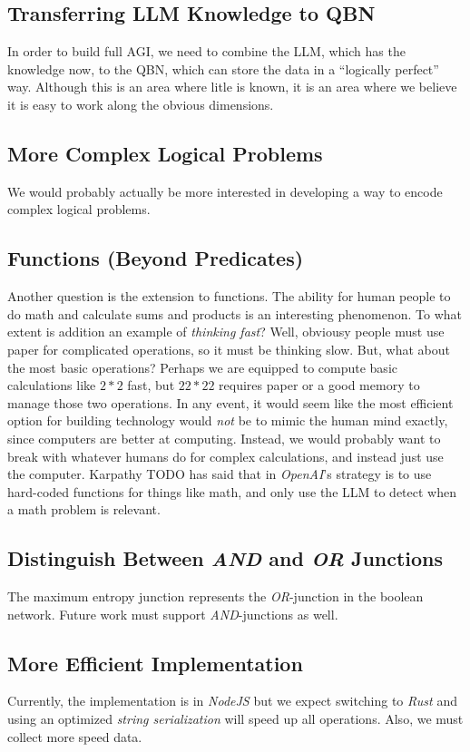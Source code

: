 \documentclass[12pt]{article}
\begin{document}
\subsection{Transferring LLM Knowledge to QBN}
In order to build full AGI, we need to combine the LLM, which has the knowledge now, to the QBN, which can store the data in a ``logically perfect'' way.
Although this is an area where litle is known, it is an area where we believe it is easy to work along the obvious dimensions.

\subsection{More Complex Logical Problems}
We would probably actually be more interested in developing a way to encode complex logical problems.

\subsection{Functions (Beyond Predicates)}
Another question is the extension to functions.
The ability for human people to do math and calculate sums and products is an interesting phenomenon.
To what extent is addition an example of {\em thinking fast}?
Well, obviousy people must use paper for complicated operations, so it must be thinking slow.
But, what about the most basic operations?
Perhaps we are equipped to compute basic calculations like $2 * 2$ fast, but $22 * 22$ requires paper or a good memory to manage those two operations.
In any event, it would seem like the most efficient option for building technology would {\em not} be to mimic the human mind exactly, since computers are better at computing.
Instead, we would probably want to break with whatever humans do for complex calculations, and instead just use the computer.
Karpathy TODO has said that in {\em OpenAI}'s strategy is to use hard-coded functions for things like math, and only use the LLM to detect when a math problem is relevant.

\subsection{Distinguish Between {\em AND} and {\em OR} Junctions}
The maximum entropy junction represents the {\em OR}-junction in the boolean network.
Future work must support {\em AND}-junctions as well.

\subsection{More Efficient Implementation}
Currently, the implementation is in {\em NodeJS} but we expect switching to {\em Rust} and using an optimized {\em string serialization} will speed up all operations.
Also, we must collect more speed data.
\end{document}
